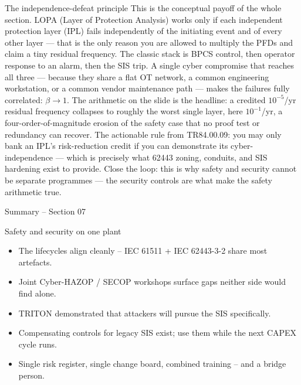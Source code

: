 \documentclass[aspectratio=169,11pt]{beamer}
\def\sectionNumber{07}
\begin{document}
\begin{frame}{The independence-defeat principle}
{  This is the conceptual payoff of the whole section. LOPA (Layer of Protection Analysis) works only if each independent protection layer (IPL) fails independently of the initiating event and of every other layer --- that is the only reason you are allowed to multiply the PFDs and claim a tiny residual frequency. The classic stack is BPCS control, then operator response to an alarm, then the SIS trip. A single cyber compromise that reaches all three --- because they share a flat OT network, a common engineering workstation, or a common vendor maintenance path --- makes the failures fully correlated: $\beta\to1$. The arithmetic on the slide is the headline: a credited $10^{-5}$/yr residual frequency collapses to roughly the worst single layer, here $10^{-1}$/yr, a four-order-of-magnitude erosion of the safety case that no proof test or redundancy can recover. The actionable rule from TR84.00.09: you may only bank an IPL's risk-reduction credit if you can demonstrate its cyber-independence --- which is precisely what 62443 zoning, conduits, and SIS hardening exist to provide. Close the loop: this is why safety and security cannot be separate programmes --- the security controls are what make the safety arithmetic true.
}
\end{frame}


\begin{frame}{Summary -- Section \sectionNumber}
\begin{takeawaybox}{Safety and security on one plant}
\begin{itemize}\setlength{\itemsep}{2pt}
  \item The lifecycles align cleanly -- IEC 61511 + IEC 62443-3-2 share most artefacts.
  \item Joint Cyber-HAZOP / SECOP workshops surface gaps neither side would find alone.
  \item TRITON demonstrated that attackers will pursue the SIS specifically.
  \item Compensating controls for legacy SIS exist; use them while the next CAPEX cycle runs.
  \item Single risk register, single change board, combined training -- and a bridge person.
\end{itemize}
\end{takeawaybox}
\end{frame}
\end{document}
